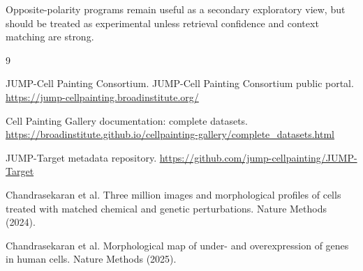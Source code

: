 \documentclass[11pt]{article}
\begin{document}
Opposite-polarity programs remain useful as a secondary exploratory view, but should be treated as experimental unless retrieval confidence and context matching are strong.

\begin{thebibliography}{9}

JUMP-Cell Painting Consortium.
JUMP-Cell Painting Consortium public portal.
\url{https://jump-cellpainting.broadinstitute.org/}

Cell Painting Gallery documentation: complete datasets.
\url{https://broadinstitute.github.io/cellpainting-gallery/complete_datasets.html}

JUMP-Target metadata repository.
\url{https://github.com/jump-cellpainting/JUMP-Target}

Chandrasekaran et al.
Three million images and morphological profiles of cells treated with matched chemical and genetic perturbations.
Nature Methods (2024).

Chandrasekaran et al.
Morphological map of under- and overexpression of genes in human cells.
Nature Methods (2025).

\end{thebibliography}
\end{document}
